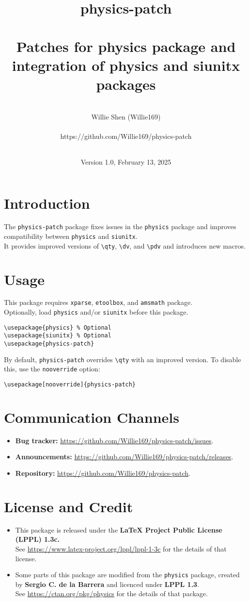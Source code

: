 \documentclass[a4paper,12pt]{article}
\title{{\huge physics-patch}\\\mbox{}\\{\Large\textnormal{Patches for physics package and integration of physics and siunitx packages}}}
\author{{\LARGE\mbox{}\\Willie Shen (Willie169)}\\\mbox{}\\{\Large https://github.com/Willie169/physics-patch}}
\date{\Large\mbox{}\\Version 1.0, February 13, 2025}
\let\patchedquantity\patchedphysicsquantity
\let\qty\patchedquantity
\let\dv\derivative
\let\pdv\partialderivative
\renewcommand{\maketitle}{
\begin{titlepage}
\begin{center}
\vspace*{\fill}
{\huge \bfseries \thetitle\par}
\vskip 1.5em
{\Large \theauthor\par}
\vskip 1em
{\large \thedate\par}
\vspace*{\fill}
\end{center}
\end{titlepage}
}
\begin{document}
\thispagestyle{empty}\Needspace{1\textheight}\maketitle\Needspace{1\textheight}\setcounter{page}{1}
\section{Introduction}
The \texttt{physics-patch} package fixes issues in the \texttt{physics} package and improves compatibility between \texttt{physics} and \texttt{siunitx}.\\
It provides improved versions of \verb|\qty|, \verb|\dv|, and \verb|\pdv| and introduces new macros.
\section{Usage}
This package requires \texttt{xparse}, \texttt{etoolbox}, and \texttt{amsmath} package.\\
Optionally, load \texttt{physics} and/or \texttt{siunitx} before this package.
\begin{verbatim}
\usepackage{physics} % Optional
\usepackage{siunitx} % Optional
\usepackage{physics-patch}
\end{verbatim}
By default, \texttt{physics-patch} overrides \verb|\qty| with an improved version. To disable this, use the \texttt{nooverride} option:
\begin{verbatim}
\usepackage[nooverride]{physics-patch}
\end{verbatim}
\section{Communication Channels}
\begin{itemize}
\item \textbf{Bug tracker:} \href{https://github.com/Willie169/physics-patch/issues}{https://github.com/Willie169/physics-patch/issues}.
\item \textbf{Announcements:} \href{https://github.com/Willie169/physics-patch/releases}{https://github.com/Willie169/physics-patch/releases}.
\item \textbf{Repository:} \href{https://github.com/Willie169/physics-patch}{https://github.com/Willie169/physics-patch}.
\end{itemize}
\section{License and Credit}
\begin{itemize}
\item
This package is released under the \textbf{LaTeX Project Public License (LPPL) 1.3c.}\\
See \href{https://www.latex-project.org/lppl/lppl-1-3c}{https://www.latex-project.org/lppl/lppl-1-3c} for the details of that license.
\item Some parts of this package are modified from the \texttt{physics} package, created by \textbf{Sergio C. de la Barrera} and licenced under \textbf{LPPL 1.3}.\\
See \href{https://ctan.org/pkg/physics}{https://ctan.org/pkg/physics} for the details of that package.
\end{itemize}
\end{document}
